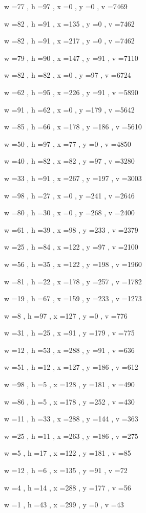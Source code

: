 \documentclass[11pt]{article}
\begin{document}
w =77 , h =97 , x =0 , y =0 , v =7469
\par
w =82 , h =91 , x =135 , y =0 , v =7462
\par
w =82 , h =91 , x =217 , y =0 , v =7462
\par
w =79 , h =90 , x =147 , y =91 , v =7110
\par
w =82 , h =82 , x =0 , y =97 , v =6724
\par
w =62 , h =95 , x =226 , y =91 , v =5890
\par
w =91 , h =62 , x =0 , y =179 , v =5642
\par
w =85 , h =66 , x =178 , y =186 , v =5610
\par
w =50 , h =97 , x =77 , y =0 , v =4850
\par
w =40 , h =82 , x =82 , y =97 , v =3280
\par
w =33 , h =91 , x =267 , y =197 , v =3003
\par
w =98 , h =27 , x =0 , y =241 , v =2646
\par
w =80 , h =30 , x =0 , y =268 , v =2400
\par
w =61 , h =39 , x =98 , y =233 , v =2379
\par
w =25 , h =84 , x =122 , y =97 , v =2100
\par
w =56 , h =35 , x =122 , y =198 , v =1960
\par
w =81 , h =22 , x =178 , y =257 , v =1782
\par
w =19 , h =67 , x =159 , y =233 , v =1273
\par
w =8 , h =97 , x =127 , y =0 , v =776
\par
w =31 , h =25 , x =91 , y =179 , v =775
\par
w =12 , h =53 , x =288 , y =91 , v =636
\par
w =51 , h =12 , x =127 , y =186 , v =612
\par
w =98 , h =5 , x =128 , y =181 , v =490
\par
w =86 , h =5 , x =178 , y =252 , v =430
\par
w =11 , h =33 , x =288 , y =144 , v =363
\par
w =25 , h =11 , x =263 , y =186 , v =275
\par
w =5 , h =17 , x =122 , y =181 , v =85
\par
w =12 , h =6 , x =135 , y =91 , v =72
\par
w =4 , h =14 , x =288 , y =177 , v =56
\par
w =1 , h =43 , x =299 , y =0 , v =43
\par
\newpage
\end{document}
